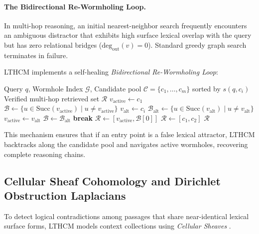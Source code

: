 \documentclass[11pt,a4paper]{article}
\begin{document}
\paragraph{The Bidirectional Re-Wormholing Loop.} In multi-hop reasoning, an initial nearest-neighbor search frequently encounters an ambiguous distractor that exhibits high surface lexical overlap with the query but has zero relational bridges ($\mathrm{deg}_{\mathrm{out}}(v) = 0$). Standard greedy graph search terminates in failure.

LTHCM implements a self-healing \emph{Bidirectional Re-Wormholing Loop}:
\begin{algorithm}[H]
\caption{Bidirectional Re-Wormholing Loop}
\begin{algorithmic}[1]
\REQUIRE Query $q$, Wormhole Index $\mathcal{G}$, Candidate pool $\mathcal{C} = \{c_1, \dots, c_m\}$ sorted by $s(q, c_i)$
\ENSURE Verified multi-hop retrieved set $\mathcal{R}$
\STATE $v_{\mathrm{active}} \leftarrow c_1$
\STATE $\mathcal{B} \leftarrow \{u \in \mathrm{Succ}(v_{\mathrm{active}}) \mid u \ne v_{\mathrm{active}}\}$
        \STATE $v_{\mathrm{alt}} \leftarrow c_i$
        \STATE $\mathcal{B}_{\mathrm{alt}} \leftarrow \{u \in \mathrm{Succ}(v_{\mathrm{alt}}) \mid u \ne v_{\mathrm{alt}}\}$
            \STATE $v_{\mathrm{active}} \leftarrow v_{\mathrm{alt}}$
            \STATE $\mathcal{B} \leftarrow \mathcal{B}_{\mathrm{alt}}$
            \STATE \textbf{break}
        \ENDIF
    \ENDFOR
\ENDIF
{}
    \STATE $\mathcal{R} \leftarrow [v_{\mathrm{active}}, \mathcal{B}[0]]$
\ELSE
    \STATE $\mathcal{R} \leftarrow [c_1, c_2]$
\ENDIF
\RETURN $\mathcal{R}$
\end{algorithmic}
\end{algorithm}
This mechanism ensures that if an entry point is a false lexical attractor, LTHCM backtracks along the candidate pool and navigates active wormholes, recovering complete reasoning chains.

\subsection{Cellular Sheaf Cohomology and Dirichlet Obstruction Laplacians}

To detect logical contradictions among passages that share near-identical lexical surface forms, LTHCM models context collections using \emph{Cellular Sheaves} \cite{curry2014sheaves,bodnar2022neural}.
\end{document}
